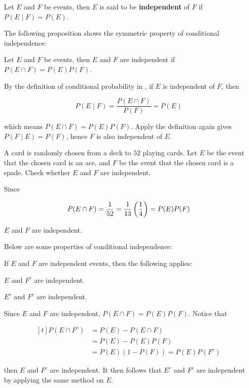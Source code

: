 \documentclass[a4paper,12pt]{article}
\begin{document}
\begin{dft}
  Let $E$ and $F$ be events, then $E$ is said to be \textbf{independent} of $F$ if $P(E\mid F)=P(E)$.
\end{dft}\n

The following proposition shows the symmetric property of conditional independence:\n

\begin{pst}
  Let $E$ and $F$ be events, then $E$ and $F$ are independent if $P(E\cap F)=P(E)P(F)$.\n

  \prf By the definition of conditional probability in \rdft[\sctd{8}], if $E$ is independent of $F$, then

  $$P(E\mid F)=\frac{P(E\cap F)}{P(F)}=P(E)$$\s
  
  which means $P(E\cap F)=P(E)P(F)$. Apply the definition again gives $P(F\mid E)=P(F)$, hence $F$ is also independent of $E$.
\end{pst}\n

\begin{exm}
  A card is randomly chosen from a deck to $52$ playing cards. Let $E$ be the event that the chosen card is an ace, and $F$ be the event that the chosen card is a spade. Check whether $E$ and $F$ are independent.\n

  \ans Since

  $$P(E\cap F)=\frac{1}{52}=\frac{1}{13}\left( \frac{1}{4}\right)=P(E)P(F)$$\s

  $E$ and $F$ are independent.
\end{exm}\n

Below are some properties of conditional independence:\n

\begin{pst}
  If $E$ and $F$ are independent events, then the following applies:
  
  \begin{alist}
    \item $E$ and $F^{c}$ are independent.
    \item $E^{c}$ and $F^{c}$ are independent.
  \end{alist}

  \prf Since $E$ and $F$ are independent, $P(E\cap F)=P(E)P(F)$. Notice that

  $$\begin{aligned}[t]
    P(E\cap F^{c})&=P(E)-P(E\cap F)\\
    &=P(E)-P(E)P(F)\\
    &=P(E)(1-P(F))=P(E)P(F^{c})
  \end{aligned}$$\s

  then $E$ and $F^{c}$ are independent. It then follows that $E^{c}$ and $F^{c}$ are independent by applying the same method on $E$.
\end{pst}\n
\end{document}
